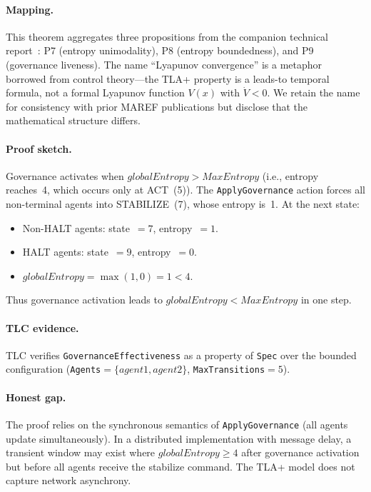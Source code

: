 \documentclass[11pt]{article}
\begin{document}
\paragraph{Mapping.} This theorem aggregates three propositions from the
companion technical report~\cite{maref-w3}: P7 (entropy unimodality), P8
(entropy boundedness), and P9 (governance liveness). The name ``Lyapunov
convergence'' is a metaphor borrowed from control theory---the TLA+ property
is a leads-to temporal formula, not a formal Lyapunov function $V(x)$ with
$\dot{V} < 0$. We retain the name for consistency with prior MAREF publications
but disclose that the mathematical structure differs.

\paragraph{Proof sketch.} Governance activates when
$\mathit{globalEntropy} > \mathit{MaxEntropy}$ (i.e., entropy reaches~4, which
occurs only at ACT~(5)). The \texttt{ApplyGovernance} action forces all
non-terminal agents into STABILIZE~(7), whose entropy is~1. At the next state:
\begin{itemize}
  \item Non-HALT agents: state~$=7$, entropy~$=1$.
  \item HALT agents: state~$=9$, entropy~$=0$.
  \item $\mathit{globalEntropy} = \max(1, 0) = 1 < 4$.
\end{itemize}
Thus governance activation leads to $\mathit{globalEntropy} < \mathit{MaxEntropy}$
in one step.

\paragraph{TLC evidence.} TLC verifies \texttt{GovernanceEffectiveness} as a
property of \texttt{Spec} over the bounded configuration
(\texttt{Agents}$=\{\textit{agent1}, \textit{agent2}\}$,
\texttt{MaxTransitions}$=5$).

\paragraph{Honest gap.} The proof relies on the synchronous semantics of
\texttt{ApplyGovernance} (all agents update simultaneously). In a distributed
implementation with message delay, a transient window may exist where
$\mathit{globalEntropy} \geq 4$ after governance activation but before all
agents receive the stabilize command. The TLA+ model does not capture network
asynchrony.
\end{document}
